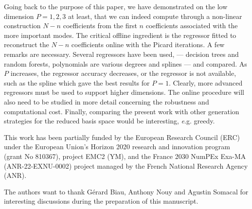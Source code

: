 \documentclass[graybox]{svmult}
\begin{document}
Going back to the purpose of this paper, we have demonstrated on the low dimension $P=1,2,3$ at least, that we can indeed compute through a non-linear construction $N-n$ coefficients from the first $n$ coefficients associated with the more important modes. The critical offline ingredient is the regressor fitted to reconstruct the $N-n$ coefficients online with the Picard iterations. A few remarks are necessary. Several regressors have been used, --- decision trees and random forests, polynomials are various degrees and splines --- and compared. As $P$ increases, the regressor accuracy decreases, or the regressor is not available, such as the spline which gave the best results for $P=1$. Clearly, more advanced regressors must be used to support higher dimensions. The online procedure will also need to be studied in more detail concerning the robustness and computational cost. Finally, comparing the present work with other generation strategies for the reduced basis space would be interesting, {\emph e.g.} greedy.

\begin{acknowledgement}
This work has been partially funded by the European Research Council (ERC) under the European
Union’s Horizon 2020 research and innovation program (grant No 810367), project EMC2 (YM), and the France 2030 NumPEx Exa-MA (ANR-22-EXNU-0002) project managed by the French National Research Agency (ANR).


The authors want to thank Gérard Biau, Anthony Nouy and Agustin Somacal for interesting discussions during the preparation of this manuscript.
\end{acknowledgement}



\end{document}
